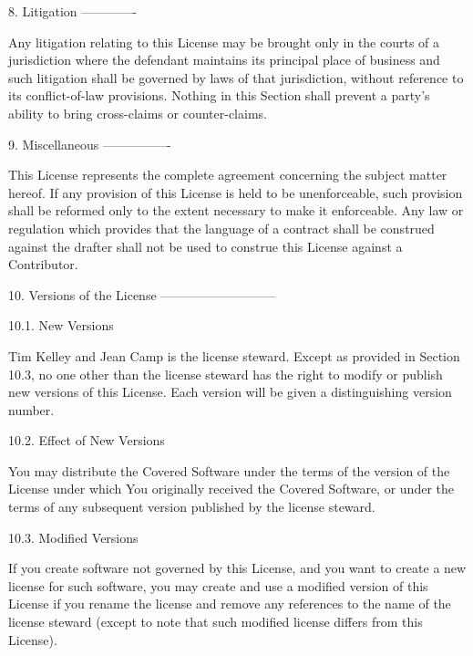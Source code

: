 8. Litigation
-------------

Any litigation relating to this License may be brought only in the
courts of a jurisdiction where the defendant maintains its principal
place of business and such litigation shall be governed by laws of that
jurisdiction, without reference to its conflict-of-law provisions.
Nothing in this Section shall prevent a party's ability to bring
cross-claims or counter-claims.

9. Miscellaneous
----------------

This License represents the complete agreement concerning the subject
matter hereof. If any provision of this License is held to be
unenforceable, such provision shall be reformed only to the extent
necessary to make it enforceable. Any law or regulation which provides
that the language of a contract shall be construed against the drafter
shall not be used to construe this License against a Contributor.

10. Versions of the License
---------------------------

10.1. New Versions

Tim Kelley and Jean Camp is the license steward. Except as provided in Section
10.3, no one other than the license steward has the right to modify or
publish new versions of this License. Each version will be given a
distinguishing version number.

10.2. Effect of New Versions

You may distribute the Covered Software under the terms of the version
of the License under which You originally received the Covered Software,
or under the terms of any subsequent version published by the license
steward.

10.3. Modified Versions

If you create software not governed by this License, and you want to
create a new license for such software, you may create and use a
modified version of this License if you rename the license and remove
any references to the name of the license steward (except to note that
such modified license differs from this License).



